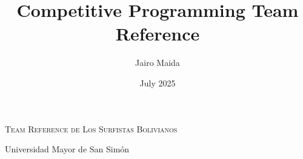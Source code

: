 \documentclass{article}
\title{Competitive Programming Team Reference}
\author{Jairo Maida}
\date{July 2025}
\begin{document}
	\begin{center}
		\Huge\textsc{Team Reference de Los Surfistas Bolivianos}
		
		\vspace{0.35cm}
		
		\huge Universidad Mayor de San Simón
		
		\vspace{0.35cm}
		
	\end{center}

	
	\begin{multicols}{2}
		\tableofcontents
	\end{multicols}
	
	\pagebreak
		
	
	\pagebreak
	
	\pagebreak
	
	\pagebreak
	
	\pagebreak
	
	\pagebreak
	
	\pagebreak
	
	\pagebreak
	
	\pagebreak
	
	\pagebreak
	
	
\end{document}
